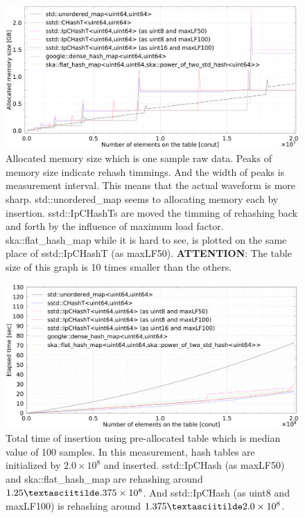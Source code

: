 \begin{figure}[h]
  \hspace{-1mm}
  \includegraphics[scale=0.24]{./fig_bench/usedMemory.pdf}
  \caption{
    Allocated memory size which is one sample raw data.
    Peaks of memory size indicate rehash timmings.
    And the width of peaks is measurement interval.
    This means that the actual waveform is more sharp.
    std::unordered\_map seems to allocating memory each by insertion.
    sstd::IpCHashTs are moved the timming of rehashing back and forth by the influence of maximum load factor.
    ska::flat\_hash\_map while it is hard to see, is plotted on the same place of sstd::IpCHashT (as maxLF50).
    {\bf ATTENTION}: The table size of this graph is 10 times smaller than the others.
  }
  \label{fig_bench_memory}
\end{figure}


\begin{figure}[h]
  \includegraphics[scale=0.24]{./fig_bench_sm/insert_et_preAlloc_med.pdf}
  \caption{
    Total time of insertion using pre-allocated table which is median value of 100 samples.
    In this measurement, hash tables are initialized by $2.0\times10^8$ and inserted.
    sstd::IpCHash (as maxLF50) and ska::flat\_hash\_map are rehashing around $1.25\textasciitilde.375\times10^8$.
    And sstd::IpCHash (as uint8 and maxLF100) is rehashing around $1.375\textasciitilde2.0\times10^8$.
  }
  \label{fig_bench_insert_preAlloc_sm}
\end{figure}

